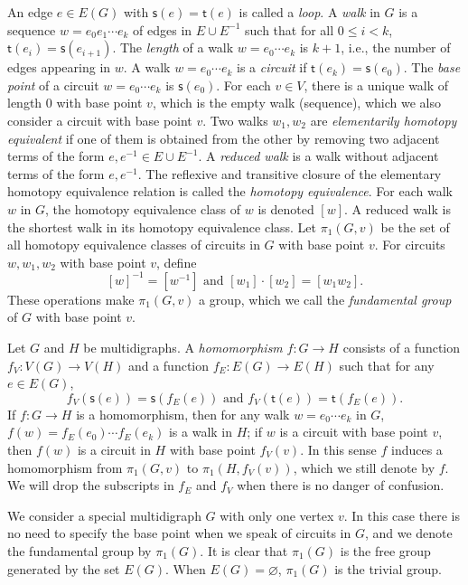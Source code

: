 \documentclass[11pt]{amsart}
\theoremstyle{definition}
\theoremstyle{definition}
\numberwithin{equation}{section}
\begin{document}
An edge $e\in E(G)$ with $\mathsf{s}(e)=\mathsf{t}(e)$ is called a {\em loop}. A {\em walk} in $G$ is a sequence $w=e_0e_1\cdots e_k$ of edges in $E\cup E^{-1}$ such that for all $0\leq i<k$, $\mathsf{t}(e_i)=\mathsf{s}(e_{i+1})$. The {\em length} of a walk $w=e_0\cdots e_k$ is $k+1$, i.e., the number of edges appearing in $w$. A walk $w=e_0 \cdots e_k$ is a {\em circuit} if $\mathsf{t}(e_k)=\mathsf{s}(e_0)$. The {\em base point} of a circuit $w=e_0\cdots e_k$ is $\mathsf{s}(e_0)$. For each $v\in V$, there is a unique walk of length $0$ with base point $v$, which is the empty walk (sequence), which we also consider a circuit with base point $v$. Two walks $w_1, w_2$ are {\em elementarily homotopy equivalent} if one of them is obtained from the other by removing two adjacent terms of the form $e, e^{-1}\in E\cup E^{-1}$. A {\em reduced walk} is a walk without adjacent terms of the form $e, e^{-1}$. The reflexive and transitive closure of the elementary homotopy equivalence relation is called the {\em homotopy equivalence}. For each walk $w$ in $G$, the homotopy equivalence class of $w$ is denoted $[w]$. A reduced walk is the shortest walk in its homotopy equivalence class. Let $\pi_1(G, v)$ be the set of all homotopy equivalence classes of  circuits in $G$ with base point $v$. For circuits $w, w_1, w_2$ with base point $v$, define
$$ [w]^{-1}=[w^{-1}] \mbox{ and } [w_1]\cdot[w_2]=[w_1w_2]. $$
These operations make $\pi_1(G, v)$ a group, which we call the {\em fundamental group} of $G$ with base point $v$.

Let $G$ and $H$ be multidigraphs. A {\em homomorphism} $f\colon G\to H$ consists of a function $f_V\colon V(G)\to V(H)$ and a function $f_E\colon E(G)\to E(H)$ such that for any $e\in E(G)$, 
$$ f_V(\mathsf{s}(e))=\mathsf{s}(f_E(e)) \mbox{ and } f_V(\mathsf{t}(e))=\mathsf{t}(f_E(e)). $$
If $f\colon G\to H$ is a homomorphism, then for any walk $w=e_0\cdots e_k$ in $G$, $f(w)=f_E(e_0)\cdots f_E(e_k)$ is a walk in $H$; if $w$ is a circuit with base point $v$, then $f(w)$ is a circuit in $H$ with base point $f_V(v)$. In this sense $f$ induces a homomorphism from $\pi_1(G, v)$ to $\pi_1(H, f_V(v))$, which we still denote by $f$. We will drop the subscripts in $f_E$ and $f_V$ when there is no danger of confusion.

We consider a special multidigraph $G$ with only one vertex $v$. In this case there is no need to specify the base point when we speak of circuits in $G$, and we denote the fundamental group by $\pi_1(G)$. It is clear that $\pi_1(G)$ is the free group generated by the set $E(G)$. When $E(G)=\varnothing$, $\pi_1(G)$ is the trivial group. 
\end{document}

